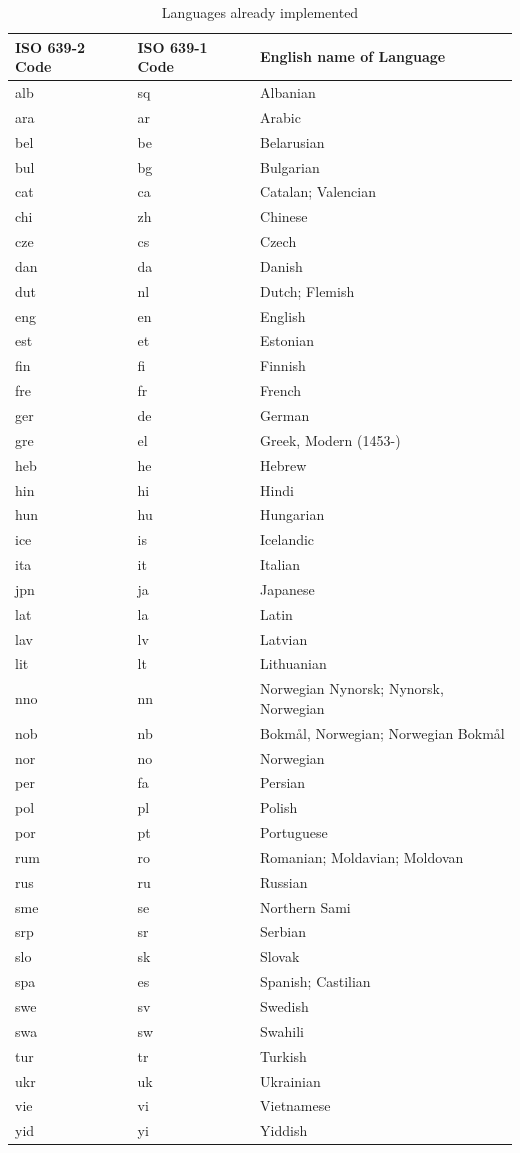 \documentclass[12pt, twoside]{article}
\begin{document}
\begin{table}[!htp]
    \caption{Languages already implemented}
    \label{tab:languagesImplemented}
    \begin{footnotesize}

    \begin{tabular}{L{3cm}|L{3cm}|L{6.5cm}}
      \textbf{\gls{ISO} 639-2 Code} & \textbf{\gls{ISO} 639-1 Code} & \textbf{English name of Language}\\
      \hline
alb & sq & Albanian\\
ara & ar & Arabic\\
bel & be & Belarusian\\
bul & bg & Bulgarian\\
cat & ca & Catalan; Valencian\\
chi & zh & Chinese\\
cze & cs & Czech\\
dan & da & Danish\\
dut & nl & Dutch; Flemish\\
eng & en & English\\
est & et & Estonian\\
fin & fi & Finnish\\
fre & fr & French\\
ger & de & German\\
gre & el & Greek, Modern (1453-)\\
heb & he & Hebrew\\
hin & hi & Hindi\\
hun & hu & Hungarian\\
ice & is & Icelandic\\
ita & it & Italian\\
jpn & ja & Japanese\\
lat & la & Latin\\
lav & lv & Latvian\\
lit & lt & Lithuanian\\
nno & nn & Norwegian Nynorsk; Nynorsk, Norwegian\\
nob & nb & Bokmål, Norwegian; Norwegian Bokmål\\
nor & no & Norwegian\\
per & fa & Persian\\
pol & pl & Polish\\
por & pt & Portuguese\\
rum & ro & Romanian; Moldavian; Moldovan\\
rus & ru & Russian\\
sme & se & Northern Sami\\
srp & sr & Serbian\\
slo & sk & Slovak\\
spa & es & Spanish; Castilian\\
swe & sv & Swedish\\
swa & sw & Swahili\\
tur & tr & Turkish\\
ukr & uk & Ukrainian\\
vie & vi & Vietnamese\\
yid & yi & Yiddish\\
\hline
   \end{tabular}  
    \end{footnotesize}
\end{table}
\end{document}
